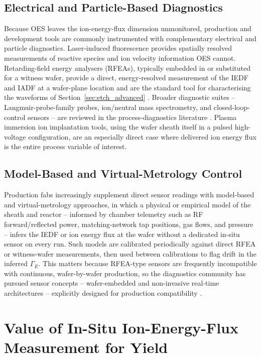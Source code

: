 \subsection{Electrical and Particle-Based Diagnostics}

Because OES leaves the ion-energy-flux dimension unmonitored, production and development tools are commonly instrumented with complementary electrical and particle diagnostics. Laser-induced fluorescence provides spatially resolved measurements of reactive species and ion velocity information OES cannot. Retarding-field energy analysers (RFEAs), typically embedded in or substituted for a witness wafer, provide a direct, energy-resolved measurement of the IEDF and IADF at a wafer-plane location and are the standard tool for characterising the waveforms of Section~\ref{sec:etch_advanced} \cite{ref0548,ref0556}. Broader diagnostic suites -- Langmuir-probe-family probes, ion/neutral mass spectrometry, and closed-loop-control sensors -- are reviewed in the process-diagnostics literature \cite{ref0548,ref0553,ref0556}. Plasma immersion ion implantation tools, using the wafer sheath itself in a pulsed high-voltage configuration, are an especially direct case where delivered ion energy flux is the entire process variable of interest.

\subsection{Model-Based and Virtual-Metrology Control}

Production fabs increasingly supplement direct sensor readings with model-based and virtual-metrology approaches, in which a physical or empirical model of the sheath and reactor -- informed by chamber telemetry such as RF forward/reflected power, matching-network tap positions, gas flows, and pressure -- infers the IEDF or ion energy flux at the wafer without a dedicated in-situ sensor on every run. Such models are calibrated periodically against direct RFEA or witness-wafer measurements, then used between calibrations to flag drift in the inferred $\Gamma_{E}$. This matters because RFEA-type sensors are frequently incompatible with continuous, wafer-by-wafer production, so the diagnostics community has pursued sensor concepts -- wafer-embedded and non-invasive real-time architectures -- explicitly designed for production compatibility \cite{ref0548,ref0553}.

\section{Value of In-Situ Ion-Energy-Flux Measurement for Yield}

